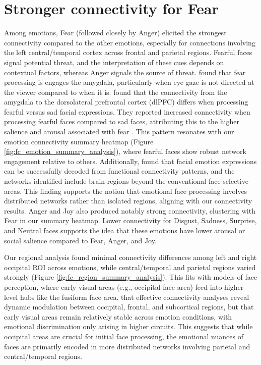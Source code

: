 \section{Stronger connectivity for Fear}
Among emotions, Fear (followed closely by Anger) elicited the strongest connectivity compared to the other emotions, especially for connections involving the left central/temporal cortex across frontal and parietal regions. 
Fearful faces signal potential threat, and the interpretation of these cues depends on contextual factors, whereas Anger signals the source of threat. 
\cite{cushing_neurodynamics_2018} found that fear processing is engages the amygdala, particularly when eye gaze is not directed at the viewer compared to when it is.
\cite{jamieson_differential_2021} found that the connectivity from the amygdala to the dorsolateral prefrontal cortex (dlPFC) differs when processing fearful versus sad facial expressions. 
They reported increased connectivity when processing fearful faces compared to sad faces, attributing this to the higher salience and arousal associated with fear \citep{adolphs_biology_2013}.
This pattern resonates with our emotion connectivity summary heatmap (Figure \ref{fig:fc_emotion_summary_analysis}), where fearful faces show robust network engagement relative to others. 
Additionally, \cite{liang_multivariate_2018} found that facial emotion expressions can be successfully decoded from functional connectivity patterns, and the networks identified include brain regions beyond the conventional face-selective areas. 
This finding supports the notion that emotional face processing involves distributed networks rather than isolated regions, aligning with our connectivity results.
Anger and Joy also produced notably strong connectivity, clustering with Fear in our summary heatmap. 
Lower connectivity for Disgust, Sadness, Surprise, and Neutral faces supports the idea that these emotions have lower arousal or social salience compared to Fear, Anger, and Joy.

Our regional analysis found minimal connectivity differences among left and right occipital ROI across emotions, while central/temporal and parietal regions varied strongly (Figure \ref{fig:fc_region_summary_analysis}).
This fits with models of face perception, where early visual areas (e.g., occipital face area) feed into higher-level hubs like the fusiform face area. 
\cite{underwood_networks_2021} that effective connectivity analyses reveal dynamic modulation between occipital, frontal, and subcortical regions, but that early visual areas remain relatively stable across emotion conditions, with emotional discrimination only arising in higher circuits. 
This suggests that while occipital areas are crucial for initial face processing, the emotional nuances of faces are primarily encoded in more distributed networks involving parietal and central/temporal regions.

